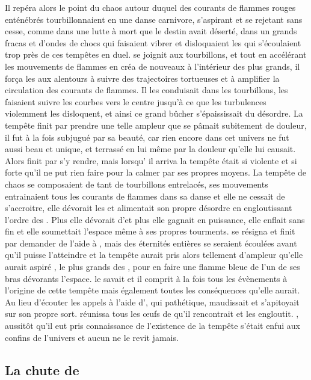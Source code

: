   Il repéra alors le point du chaos autour duquel des courants de flammes rouges enténébrés tourbillonnaient en une danse carnivore, s'aspirant et se rejetant sans cesse, comme dans une lutte à mort que le destin avait déserté,  dans un grands fracas et d'ondes de chocs qui faisaient vibrer et disloquaient les \SC qui s'écoulaient trop près de ces tempêtes en duel. \Ogo se joignit aux tourbillons, et tout en accélérant les mouvements de flammes en créa de nouveaux à l'intérieur des plus grands, il força les \SC aux alentours à suivre des trajectoires tortueuses et à amplifier la circulation des courants de flammes. Il les conduisait dans les tourbillons, les faisaient suivre les courbes vers le centre jusqu'à ce que les turbulences violemment les disloquent, et ainsi ce grand bûcher s'épaississait du désordre. La tempête finit par prendre une telle ampleur que \Mey se pâmait subitement de douleur, il fut à la fois subjugué par sa beauté, car rien encore dans cet univers ne fut aussi beau et unique, et terrassé en lui même par la douleur qu'elle lui causait. Alors \Esu finit par s'y rendre, mais lorsqu' il arriva la tempête était si violente et si forte qu'il ne put rien faire pour la calmer par ses propres moyens. La tempête de chaos se composaient de tant de tourbillons entrelacés, ses mouvements entrainaient tous les courants de flammes dans sa danse et elle ne cessait de s'accroitre, elle dévorait les \SC et alimentait son propre désordre en engloutissant l'ordre des \SC. Plus elle dévorait d'\SC et plus elle gagnait en puissance, elle enflait sans fin et elle soumettait l'espace même à ses propres tourments. \Esu se résigna et finit par demander de l'aide à \Boromu, mais des éternités entières se seraient écoulées avant qu'il puisse l'atteindre et la tempête aurait pris alors tellement d'ampleur qu'elle aurait aspiré \Boromu, le plus grands des \Dormus, pour en faire une flamme bleue de l'un de ses bras dévorants l'espace. \Boromu le savait et il comprit à la fois tous les évènements à l'origine de cette tempête mais également toutes les conséquences qu'elle aurait. Au lieu d'écouter les appels à l'aide d'\Esu, qui pathétique, maudissait \Ogo et s'apitoyait sur son propre sort. \Boromu réunissa tous les œufs de \Tot qu'il rencontrait et les engloutit. \Tot, aussitôt qu'il eut pris connaissance de l'existence de la tempête s'était enfui aux confins de l'univers et aucun \Dormus ne le revit jamais.      
   
   
  \subsection{La chute de \Mey}
  
